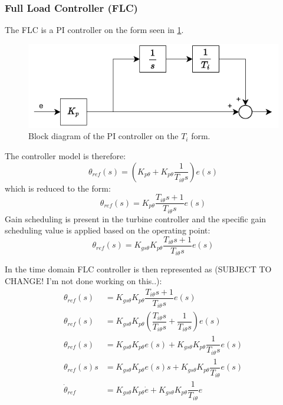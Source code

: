 \subsubsection{Full Load Controller (FLC)} \label{sec:mod_wtLin_FLC}
The FLC is a PI controller on the form seen in \cref{fig:PIcontroller}.
\begin{figure}[ht]
	\centering
	\includegraphics[width=0.5\linewidth]{Graphics/PiController.pdf}
	\caption{Block diagram of the PI controller on the \textit{$T_i$} form.}
	\label{fig:PIcontroller}
\end{figure}
The controller model is therefore:
\begin{equation}\label{eq:wtlin_comp_flc_1}
	\theta_{ref}(s) = (K_{p \theta} + K_{p \theta} \dfrac{1}{T_{i \theta} s}) e(s)
\end{equation}
which is reduced to the form:
\begin{equation}\label{eq:wtlin_comp_flc_2}
	\theta_{ref}(s) = K_{p \theta}\dfrac{T_{i \theta} s + 1}{T_{i \theta} s} e(s)
\end{equation}
Gain scheduling is present in the turbine controller and the specific gain scheduling value is applied based on the operating point:
\begin{equation}\label{eq:wtlin_comp_flc_3}
	\theta_{ref}(s) = K_{gs \theta} K_{p \theta} \dfrac{T_{i \theta} s + 1}{T_{i \theta} s} e(s)
\end{equation}

In the time domain FLC controller is then represented as (SUBJECT TO CHANGE! I'm not done working on this..):
\begin{align}
	\theta_{ref}(s) & = K_{gs \theta} K_{p \theta} \dfrac{T_{i \theta} s + 1}{T_{i \theta} s} e(s) \\
	\theta_{ref}(s) & = K_{gs \theta} K_{p \theta} (\dfrac{T_{i \theta} s}{T_{i \theta} s} + \dfrac{1}{T_{i \theta} s}) e(s) \\
	\theta_{ref}(s) & = K_{gs \theta} K_{p \theta} e(s) +  K_{gs \theta} K_{p \theta} \dfrac{1}{T_{i \theta} s}e(s) \\
	\theta_{ref}(s) s & = K_{gs \theta} K_{p \theta} e(s) s +  K_{gs \theta} K_{p \theta} \dfrac{1}{T_{i \theta}}e(s) \\
	\dot{\theta}_{ref} & = K_{gs \theta} K_{p \theta} \dot{e} +  K_{gs \theta} K_{p \theta} \dfrac{1}{T_{i \theta}}e
\end{align}

